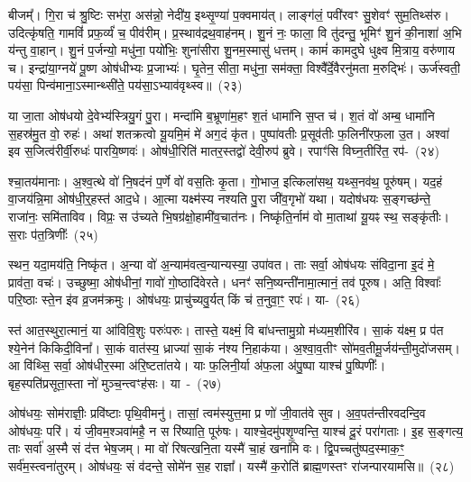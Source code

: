 बीजम्᳚। गि॒रा च॑ श्रु॒ष्टिः सभ॑रा॒ अस॑न्नो॒ नेदी॑य॒ इथ्सृ॒ण्या॑ प॒क्वमाय॑त्। लाङ्ग॑लं॒ पवी॑रवꣳ सु॒शेवꣳ॑ सुम॒तिथ्स॑रु। उदित्कृ॑षति॒ गामविं॑ प्रफ॒र्व्यं॑ च॒ पीव॑रीम्। प्र॒स्थाव॑द्रथ॒वाह॑नम्। शु॒नं नः॒ फाला॒ वि तु॑दन्तु॒ भूमिꣳ॑ शु॒नं की॒नाशा॑ अ॒भि य॑न्तु वा॒हान्। शु॒नं प॒र्जन्यो॒ मधु॑ना॒ पयो॑भिः॒ शुना॑सीरा शु॒नम॒स्मासु॑ धत्तम्। कामं॑ कामदुघे धुक्ष्व मि॒त्राय॒ वरु॑णाय च। इन्द्रा॑या॒ग्नये॑ पू॒ष्ण ओष॑धीभ्यः प्र॒जाभ्यः॑। घृ॒तेन॒ सीता॒ मधु॑ना॒ सम॑क्ता॒ विश्वै᳚र्दे॒वैरनु॑मता म॒रुद्भिः॑। ऊर्ज॑स्वती॒ पय॑सा॒ पिन्व॑माना॒ऽस्मान्थ्सी॑ते॒ पय॑सा॒ऽभ्याव॑वृथ्स्व॥~(२३)

{\anuvakamend[{समो॑कसौ विश्वरूपे वि॒दुर्निर्\mbox{}ऋ॑तिर॒भि च॑ष्ट इ॒ह मि॒त्राय॒ द्वाविꣳ॑शतिश्च}]}%

या जा॒ता ओष॑धयो दे॒वेभ्य॑स्त्रियु॒गं पु॒रा। मन्दा॑मि ब॒भ्रूणा॑म॒हꣳ श॒तं धामा॑नि स॒प्त च॑। श॒तं वो॑ अम्ब॒ धामा॑नि स॒हस्र॑मु॒त वो॒ रुहः॑। अथा॑ शतक्रत्वो यू॒यमि॒मं मे॑ अग॒दं कृ॑त। पुष्पा॑वतीः प्र॒सूव॑तीः फ॒लिनी॑\-र\-फ॒ला उ॒त। अश्वा॑ इव स॒जित्व॑रीर्वी॒रुधः॑ पारयि॒ष्णवः॑। ओष॑धी॒\-रिति॑ मातर॒स्तद्वो॑ देवी॒रुप॑ ब्रुवे। रपाꣳ॑सि विघ्न॒तीरि॑त॒ रप॑-~(२४)

श्चा॒तय॑मानाः। अ॒श्व॒त्थे वो॑ नि॒षद॑नं प॒र्णे वो॑ वस॒तिः कृ॒ता। गो॒भाज॒ इत्किला॑सथ॒ यथ्स॒नव॑थ॒ पूरु॑षम्। यद॒हं वा॒जय॑न्नि॒मा ओष॑धी॒र्॒\mbox{}हस्त॑ आद॒धे। आ॒त्मा यक्ष्म॑स्य नश्यति पु॒रा जी॑व॒गृभो॑ यथा। यदोष॑धयः स॒ङ्गच्छ॑न्ते॒ राजा॑नः॒ समि॑ताविव। विप्रः॒ स उ॑च्यते भि॒षग्र॑क्षो॒हामी॑व॒चात॑नः। निष्कृ॑ति॒र्नाम॑ वो मा॒ताथा॑ यू॒यꣴ स्थ॒ सङ्कृ॑तीः। स॒राः प॑त॒त्रिणीः᳚~(२५)

स्थन॒ यदा॒मय॑ति॒ निष्कृ॑त। अ॒न्या वो॑ अ॒न्याम॑वत्व॒न्यान्यस्या॒ उपा॑वत। ताः सर्वा॒ ओष॑धयः संविदा॒ना इ॒दं मे॒ प्राव॑ता॒ वचः॑। उच्छुष्मा॒ ओष॑धीनां॒ गावो॑ गो॒ष्ठादि॑वेरते। धनꣳ॑ सनि॒ष्यन्ती॑नामा॒त्मानं॒ तव॑ पूरुष। अति॒ विश्वाः᳚ परि॒ष्ठाः स्ते॒न इ॑व व्र॒जम॑क्रमुः। ओष॑धयः॒ प्राचु॑च्यवु॒र्यत् किं च॑ त॒नुवा॒ꣳ॒ रपः॑। या-~(२६)

स्त॑ आत॒स्थुरा॒त्मानं॒ या आ॑विवि॒शुः परुः॑परुः। तास्ते॒ यक्ष्मं॒ वि बा॑धन्तामु॒ग्रो म॑ध्यम॒शीरि॑व। सा॒कं य॑क्ष्म॒ प्र प॑त श्ये॒नेन॑ किकिदी॒विना᳚। सा॒कं वात॑स्य॒ ध्राज्या॑ सा॒कं न॑श्य नि॒हाक॑या। अ॒श्वा॒व॒तीꣳ सो॑मव॒तीमू॒र्जय॑न्ती॒\-मुदो॑जसम्। आ वि॑थ्सि॒ सर्वा॒ ओष॑धीर॒स्मा अ॑रि॒ष्टता॑तये। याः फ॒लिनी॒र्या अ॑फ॒ला अ॑पु॒ष्पा याश्च॑ पु॒ष्पिणीः᳚। बृह॒स्पति॑प्रसूता॒स्ता नो॑ मुञ्च॒न्त्वꣳह॑सः। या~-~(२७)

ओष॑धयः॒ सोम॑राज्ञीः॒ प्रवि॑ष्टाः पृथि॒वीमनु॑। तासां॒ त्वम॑स्युत्त॒मा प्र णो॑ जी॒वात॑वे सुव। अ॒व॒पत॑न्तीरवदन्दि॒व ओष॑धयः॒ परि॑। यं जी॒वम॒श्ञवा॑महै॒ न स रि॑ष्याति॒ पूरु॑षः। याश्चे॒दमु॑पशृ॒ण्वन्ति॒ याश्च॑ दू॒रं परा॑गताः। इ॒ह स॒ङ्गत्य॒ ताः सर्वा॑ अ॒स्मै सं द॑त्त भेष॒जम्। मा वो॑ रिषत्खनि॒ता यस्मै॑ चा॒हं खना॑मि वः। द्वि॒पच्चतु॑ष्पद॒स्माक॒ꣳ॒ सर्व॑म॒स्त्वना॑तुरम्। ओष॑धयः॒ सं व॑दन्ते॒ सोमे॑न स॒ह राज्ञा᳚। यस्मै॑ क॒रोति॑ ब्राह्म॒णस्तꣳ रा॑जन्पारयामसि॥~(२८)

